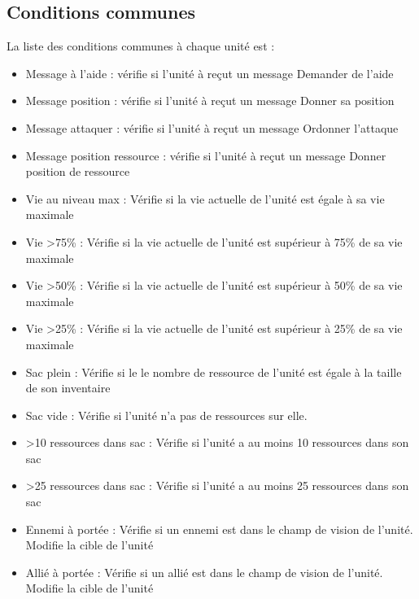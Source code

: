\documentclass{report}
\begin{document}
\paragraph{}
\subsection{Conditions communes}
La liste des conditions communes à chaque unité est :
\begin{itemize}
\item Message à l'aide : vérifie si l'unité à reçut un message Demander de l'aide
\item Message position : vérifie si l'unité à reçut un message Donner sa position
\item Message attaquer : vérifie si l'unité à reçut un message Ordonner l'attaque
\item Message position ressource : vérifie si l'unité à reçut un message Donner position de ressource
\item Vie au niveau max : Vérifie si la vie actuelle de l'unité est égale à  sa vie maximale
\item Vie \textgreater 75\% : Vérifie si la vie actuelle de l'unité est supérieur à  75\% de sa vie maximale
\item Vie \textgreater 50\% : Vérifie si la vie actuelle de l'unité est supérieur à  50\% de sa vie maximale
\item Vie \textgreater 25\% : Vérifie si la vie actuelle de l'unité est supérieur à  25\% de sa vie maximale
\item Sac plein : Vérifie si le le nombre de ressource de l'unité est égale à la taille de son inventaire
\item Sac vide : Vérifie si l'unité n'a pas de ressources sur elle.
\item \textgreater 10 ressources dans sac : Vérifie si l'unité a au moins 10 ressources dans son sac
\item \textgreater 25 ressources dans sac : Vérifie si l'unité a au moins 25 ressources dans son sac
\item Ennemi à portée : Vérifie si un ennemi est dans le champ de vision de l'unité. Modifie la cible de l'unité
\item Allié à portée : Vérifie si un allié est dans le champ de vision de l'unité. Modifie la cible de l'unité
\end{itemize}
\end{document}
